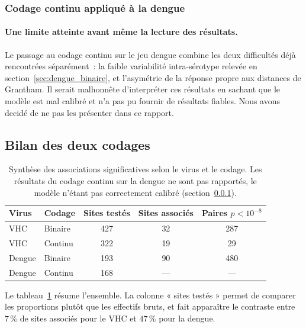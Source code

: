 \documentclass[11pt,a4paper]{article}
\begin{document}
\subsubsection{Codage continu appliqué à la dengue}
\label{sec:dengue_continu}
 
\paragraph{Une limite atteinte avant même la lecture des résultats.}
Le passage au codage continu sur le jeu dengue combine les deux difficultés déjà rencontrées
séparément~: la faible variabilité intra-sérotype relevée en section~\ref{sec:dengue_binaire}, et
l'asymétrie de la réponse propre aux distances de Grantham. Il serait malhonnête d'interpréter ces résultats
en sachant que le modèle est mal calibré et n'a pas pu fournir de résultats fiables. Nous avons decidé de ne pas les présenter dans ce rapport.

 
 
 

\subsection{Bilan des deux codages}
 
\begin{table}[h!]
    \centering
    \caption{Synthèse des associations significatives selon le virus et le codage. Les résultats
    du codage continu sur la dengue ne sont pas rapportés, le modèle n'étant pas correctement
    calibré (section~\ref{sec:dengue_continu}).}
    \label{tab:synthese}
    \begin{tabular}{llccc}
        \toprule
        Virus & Codage & Sites testés & Sites associés & Paires $p<10^{-8}$ \\
        \midrule
        VHC    & Binaire & 427 & 32 & 287 \\
        VHC    & Continu & 322 & 19 & 29 \\
        Dengue & Binaire & 193 & 90 & 480 \\
        Dengue & Continu & 168 & --- & --- \\
        \bottomrule
    \end{tabular}
\end{table}
 
Le tableau~\ref{tab:synthese} résume l'ensemble. La colonne « sites testés » permet de comparer les proportions
plutôt que les effectifs bruts, et fait apparaître le contraste entre $7\,\%$ de sites associés
pour le VHC et $47\,\%$ pour la dengue.
 
\end{document}
